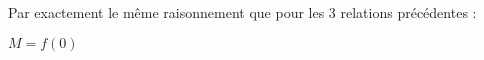 Par exactement le même raisonnement que pour les 3 relations précédentes :
\begin{result}
  $M = f(0)$
\end{result}
